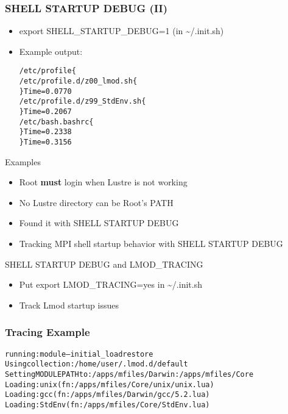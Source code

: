 \documentclass[dvipsnames,aspectratio=169]{beamer}
\begin{document}
\begin{frame}[fragile]
    \frametitle{SHELL STARTUP DEBUG (II)}
  \begin{itemize}
    \item export SHELL\_STARTUP\_DEBUG=1 (in \textasciitilde/.init.sh)
    \item Example output:
  {\small
    \begin{alltt}
    /etc/profile\{
      /etc/profile.d/z00\_lmod.sh\{
      \} Time = 0.0770
      /etc/profile.d/z99\_StdEnv.sh\{
      \} Time = 0.2067
      /etc/bash.bashrc\{
      \} Time = 0.2338
    \} Time = 0.3156
    \end{alltt}
}
  \end{itemize}
\end{frame}

\begin{frame}{Examples}
  \begin{itemize}
    \item Root \textbf{must} login when Lustre is not working
    \item No Lustre directory can be Root's PATH
    \item Found it with SHELL STARTUP DEBUG
    \item Tracking MPI shell startup behavior with SHELL STARTUP DEBUG
  \end{itemize}
\end{frame}

\begin{frame}{SHELL STARTUP DEBUG and LMOD\_TRACING}
  \begin{itemize}
    \item Put export LMOD\_TRACING=yes in \textasciitilde/.init.sh
    \item Track Lmod startup issues
  \end{itemize}
\end{frame}


\begin{frame}[fragile]
    \frametitle{Tracing Example}
  {\small
    \begin{alltt}
running: module --initial\_load restore
  Using collection:      /home/user/.lmod.d/default
  Setting MODULEPATH to: /apps/mfiles/Darwin:/apps/mfiles/Core
  Loading: unix (fn: /apps/mfiles/Core/unix/unix.lua)
  Loading: gcc (fn: /apps/mfiles/Darwin/gcc/5.2.lua)
  Loading: StdEnv (fn: /apps/mfiles/Core/StdEnv.lua)
    \end{alltt}
}
\end{frame}
\end{document}
